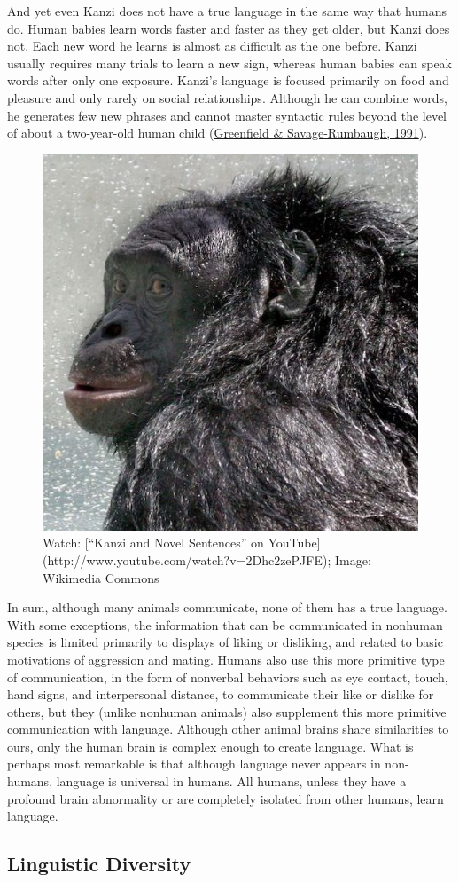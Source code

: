 \documentclass[
]{krantz}
\begin{document}
And yet even Kanzi does not have a true language in the same way that humans do. Human babies learn words faster and faster as they get older, but Kanzi does not. Each new word he learns is almost as difficult as the one before. Kanzi usually requires many trials to learn a new sign, whereas human babies can speak words after only one exposure. Kanzi's language is focused primarily on food and pleasure and only rarely on social relationships. Although he can combine words, he generates few new phrases and cannot master syntactic rules beyond the level of about a two-year-old human child (\protect\hyperlink{ref-Greenfield1991}{Greenfield \& Savage-Rumbaugh, 1991}).

\begin{figure}

{\centering \includegraphics[width=0.25\linewidth]{images/ch8/kanzi} 

}

\caption{Watch: [“Kanzi and Novel Sentences” on YouTube](http://www.youtube.com/watch?v=2Dhc2zePJFE); Image: Wikimedia Commons}\label{fig:kanzi}
\end{figure}

In sum, although many animals communicate, none of them has a true language. With some exceptions, the information that can be communicated in nonhuman species is limited primarily to displays of liking or disliking, and related to basic motivations of aggression and mating. Humans also use this more primitive type of communication, in the form of nonverbal behaviors such as eye contact, touch, hand signs, and interpersonal distance, to communicate their like or dislike for others, but they (unlike nonhuman animals) also supplement this more primitive communication with language. Although other animal brains share similarities to ours, only the human brain is complex enough to create language. What is perhaps most remarkable is that although language never appears in non-humans, language is universal in humans. All humans, unless they have a profound brain abnormality or are completely isolated from other humans, learn language.

\hypertarget{linguistic-diversity}{%
\subsection*{Linguistic Diversity}\label{linguistic-diversity}}
\end{document}
